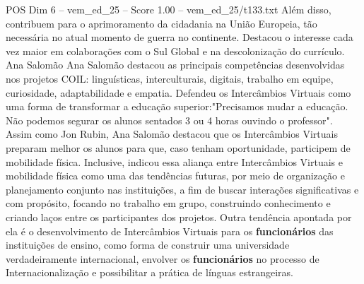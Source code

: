 \begin{textsample}{POS Dim 6 – vem\_ed\_25 – Score 1.00 – vem\_ed\_25/t133.txt}
Além disso, contribuem para o aprimoramento da cidadania na União Europeia, tão necessária no atual momento de guerra no continente.
Destacou o interesse cada vez maior em colaborações com o Sul Global e na descolonização do currículo.
Ana Salomão Ana Salomão destacou as principais competências desenvolvidas nos projetos COIL: linguísticas, interculturais, digitais, trabalho em equipe, curiosidade, adaptabilidade e empatia.
Defendeu os Intercâmbios Virtuais como uma forma de transformar a educação superior:"Precisamos mudar a educação.
Não podemos segurar os alunos sentados 3 ou 4 horas ouvindo o professor".
Assim como Jon Rubin, Ana Salomão destacou que os Intercâmbios Virtuais preparam melhor os alunos para que, caso tenham oportunidade, participem de mobilidade física.
Inclusive, indicou essa aliança entre Intercâmbios Virtuais e mobilidade física como uma das tendências futuras, por meio de organização e planejamento conjunto nas instituições, a fim de buscar interações significativas e com propósito, focando no trabalho em grupo, construindo conhecimento e criando laços entre os participantes dos projetos.
Outra tendência apontada por ela é o desenvolvimento de Intercâmbios Virtuais para os \textbf{funcionários} das instituições de ensino, como forma de construir uma universidade verdadeiramente internacional, envolver os \textbf{funcionários} no processo de Internacionalização e possibilitar a prática de línguas estrangeiras.

\end{textsample}
